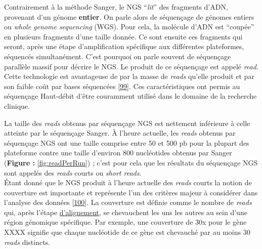 \documentclass[12pt,twoside]{reedthesis}
\theoremstyle{definition}
\theoremstyle{definition}
\theoremstyle{remark}
\begin{document}
  Contrairement à la méthode Sanger, le NGS ``\emph{lit}'' des fragments
  d'ADN, provenant d'un génome \textbf{entier}. On parle alors de
  séquençage de génomes entiers ou \emph{whole genome sequencing} (WGS).
  Pour cela, la molécule d'ADN est ``coupée'' en plusieurs fragments d'une
  taille donnée. Ce sont ensuite ces fragments qui seront, après une étape
  d'amplification spécifique aux différentes plateformes, séquencés
  simultanément. C'est pourquoi on parle souvent de séquençage parallèle
  massif pour décrire le NGS. Le produit de ce séquençage est appelé
  \emph{read}. Cette technologie est avantageuse de par la masse de
  \emph{reads} qu'elle produit et par son faible coût par bases séquencées
  {[}\protect\hyperlink{ref-Metzker2010}{99}{]}. Ces caractéristiques ont
  permis au séquençage Haut-débit d'être couramment utilisé dans le
  domaine de la recherche clinique.
  
  La taille des \emph{reads} obtenus par séquençage NGS est nettement
  inférieure à celle atteinte par le séquençage Sanger. À l'heure
  actuelle, les \emph{reads} obtenus par séquençage NGS ont une taille
  comprise entre 50 et 500 pb pour la plupart des plateforme contre une
  taille d'environ 800 nucléotides obtenus par Sanger (\textbf{Figure :}
  \ref{fig:readPerRun}) ; c'est pour cela que les résultats du séquençage
  NGS sont appelés des \emph{reads} courts ou \emph{short reads}.\\
  Étant donné que le NGS produit à l'heure actuelle des \emph{reads}
  courts la notion de couverture est importante et représente l'un des
  critères majeur à considérer dans l'analyse des données
  {[}\protect\hyperlink{ref-Sims2014}{100}{]}. La couverture est définie
  comme le nombre de \emph{reads} qui, après l'étape
  \protect\hyperlink{lalignement}{d'alignement}, se chevauchent les uns
  les autres au sein d'une région génomique spécifique. Par exemple, une
  couverture de 30x pour le gène XXXX signifie que chaque nucléotide de ce
  gène est chevauché par au moins 30 \emph{reads} distincts.
  
  \newpage
  
\end{document}
